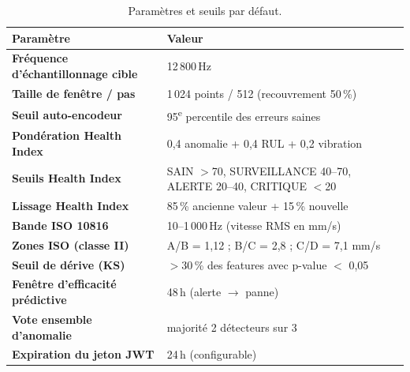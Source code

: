 \begin{table}[h]
\centering\small
\caption{Paramètres et seuils par défaut.}
\label{tab:params}
\begin{tabular}{>{\bfseries}p{5.2cm} p{8.2cm}}
\toprule
Paramètre & Valeur \\
\midrule
Fréquence d'échantillonnage cible & 12\,800\,Hz \\
Taille de fenêtre / pas & 1\,024 points / 512 (recouvrement 50\,\%) \\
Seuil auto-encodeur & 95\textsuperscript{e} percentile des erreurs saines \\
Pondération Health Index & 0{,}4 anomalie + 0{,}4 RUL + 0{,}2 vibration \\
Seuils Health Index & SAIN $>$70, SURVEILLANCE 40--70, ALERTE 20--40, CRITIQUE $<$20 \\
Lissage Health Index & 85\,\% ancienne valeur + 15\,\% nouvelle \\
Bande ISO 10816 & 10--1\,000\,Hz (vitesse RMS en mm/s) \\
Zones ISO (classe II) & A/B = 1{,}12 ; B/C = 2{,}8 ; C/D = 7{,}1 mm/s \\
Seuil de dérive (KS) & $>$30\,\% des features avec p-value $<$ 0{,}05 \\
Fenêtre d'efficacité prédictive & 48\,h (alerte $\rightarrow$ panne) \\
Vote ensemble d'anomalie & majorité 2 détecteurs sur 3 \\
Expiration du jeton JWT & 24\,h (configurable) \\
\bottomrule
\end{tabular}
\end{table}

